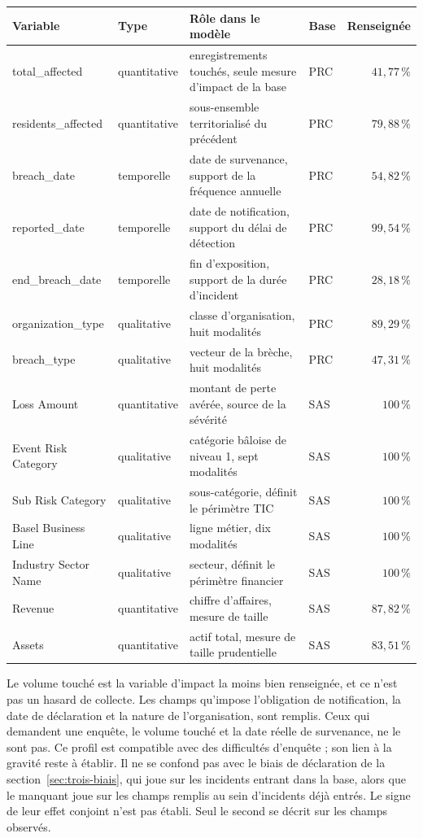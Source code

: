\begin{center}\footnotesize
\renewcommand{\arraystretch}{1.05}
\begin{tabular}{@{}>{\ttfamily\raggedright}p{3.35cm} l >{\raggedright}p{5.1cm} l r@{}}
\toprule
\textbf{Variable} & \textbf{Type} & \textbf{Rôle dans le modèle} & \textbf{Base} & \textbf{Renseignée} \\
\midrule
total\_affected & quantitative & enregistrements touchés, seule mesure d'impact de la base & PRC & $41{,}77\,\%$ \\
residents\_affected & quantitative & sous-ensemble territorialisé du précédent & PRC & $79{,}88\,\%$ \\
breach\_date & temporelle & date de survenance, support de la fréquence annuelle & PRC & $54{,}82\,\%$ \\
reported\_date & temporelle & date de notification, support du délai de détection & PRC & $99{,}54\,\%$ \\
end\_breach\_date & temporelle & fin d'exposition, support de la durée d'incident & PRC & $28{,}18\,\%$ \\
organization\_type & qualitative & classe d'organisation, huit modalités & PRC & $89{,}29\,\%$ \\
breach\_type & qualitative & vecteur de la brèche, huit modalités & PRC & $47{,}31\,\%$ \\
\midrule
Loss Amount & quantitative & montant de perte avérée, source de la sévérité & SAS & $100\,\%$ \\
Event Risk Category & qualitative & catégorie bâloise de niveau 1, sept modalités & SAS & $100\,\%$ \\
Sub Risk Category & qualitative & sous-catégorie, définit le périmètre TIC & SAS & $100\,\%$ \\
Basel Business Line & qualitative & ligne métier, dix modalités & SAS & $100\,\%$ \\
Industry Sector Name & qualitative & secteur, définit le périmètre financier & SAS & $100\,\%$ \\
Revenue & quantitative & chiffre d'affaires, mesure de taille & SAS & $87{,}82\,\%$ \\
Assets & quantitative & actif total, mesure de taille prudentielle & SAS & $83{,}51\,\%$ \\
\bottomrule
\end{tabular}
\end{center}

Le volume touché est la variable d'impact la moins bien renseignée, et ce n'est pas un hasard de collecte. Les champs qu'impose l'obligation de notification, la date de déclaration et la nature de l'organisation, sont remplis. Ceux qui demandent une enquête, le volume touché et la date réelle de survenance, ne le sont pas. Ce profil est compatible avec des difficultés d'enquête ; son lien à la gravité reste à établir. Il ne se confond pas avec le biais de déclaration de la section~\ref{sec:trois-biais}, qui joue sur les incidents entrant dans la base, alors que le manquant joue sur les champs remplis au sein d'incidents déjà entrés. Le signe de leur effet conjoint n'est pas établi. Seul le second se décrit sur les champs observés.

